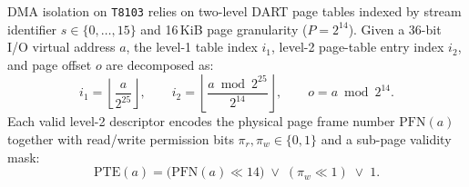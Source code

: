 \documentclass[10pt,twocolumn,letterpaper]{article}
\begin{document}
DMA isolation on \texttt{T8103} relies on two-level DART page tables indexed by stream identifier $s \in \{0,\dots,15\}$ and 16\,KiB page granularity ($P = 2^{14}$). Given a 36-bit I/O virtual address $a$, the level-1 table index $i_1$, level-2 page-table entry index $i_2$, and page offset $o$ are decomposed as:
\begin{equation}
  i_1 = \left\lfloor \frac{a}{2^{25}} \right\rfloor, \qquad
  i_2 = \left\lfloor \frac{a \bmod 2^{25}}{2^{14}} \right\rfloor, \qquad
  o = a \bmod 2^{14}.
  \label{eq:dart}
\end{equation}
Each valid level-2 descriptor encodes the physical page frame number $\mathrm{PFN}(a)$ together with read/write permission bits $\pi_r, \pi_w \in \{0,1\}$ and a sub-page validity mask:
\begin{equation}
  \mathrm{PTE}(a) = \bigl(\mathrm{PFN}(a) \ll 14\bigr) \;\lor\; (\pi_w \ll 1) \;\lor\; 1.
\end{equation}
\end{document}

